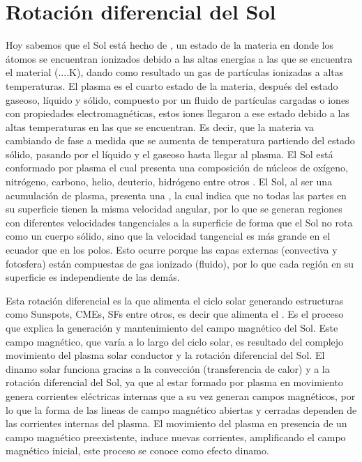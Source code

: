 \section{Rotación diferencial del Sol}
Hoy sabemos que el Sol está hecho de , un estado de la materia en donde los átomos se encuentran ionizados debido a las altas energías a las que se encuentra el material (....K), dando como resultado un gas de partículas ionizadas a altas temperaturas. El plasma es el cuarto estado de la materia, después del estado gaseoso, líquido y sólido, compuesto por un fluido de partículas cargadas o iones con propiedades electromagnéticas, estos iones llegaron a ese estado debido a las altas temperaturas en las que se encuentran. Es decir, que la materia va cambiando de fase a medida que se aumenta de temperatura partiendo del estado sólido, pasando por el líquido y el gaseoso hasta llegar al plasma. El Sol está conformado por plasma \cite[e.g,][]{cermak-2025} el cual presenta una composición de núcleos de oxígeno, nitrógeno, carbono, helio, deuterio, hidrógeno entre otros \cite[e.g.,][]{asplund-2009}. El Sol, al ser una acumulación de plasma, presenta una , la cual indica que no todas las partes en su superficie tienen la misma velocidad angular, por lo que se generan regiones con diferentes velocidades tangenciales a la superficie de forma que el Sol no rota como un cuerpo sólido, sino que la velocidad tangencial es más grande en el ecuador que en los polos. Esto ocurre porque las capas externas (convectiva y fotosfera) están compuestas de gas ionizado (fluido), por lo que cada región en su superficie es independiente de las demás.

Esta rotación diferencial es la que alimenta el ciclo solar generando estructuras como \ac{Sunspots}, \acp{CME}, \acp{SF} entre otros, es decir que alimenta el . Es el proceso que explica la generación y mantenimiento del campo magnético del Sol. Este campo magnético, que varía a lo largo del ciclo solar, es resultado del complejo movimiento del plasma solar conductor y la rotación diferencial del Sol. El dinamo solar funciona gracias a la convección (transferencia de calor) y a la rotación diferencial del Sol, ya que al estar formado por plasma en movimiento genera corrientes eléctricas internas que a su vez generan campos magnéticos, por lo que la forma de las lineas de campo magnético abiertas y cerradas dependen de las corrientes internas del plasma. El movimiento del plasma en presencia de un campo magnético preexistente, induce nuevas corrientes, amplificando el campo magnético inicial, este proceso se conoce como efecto dinamo.

